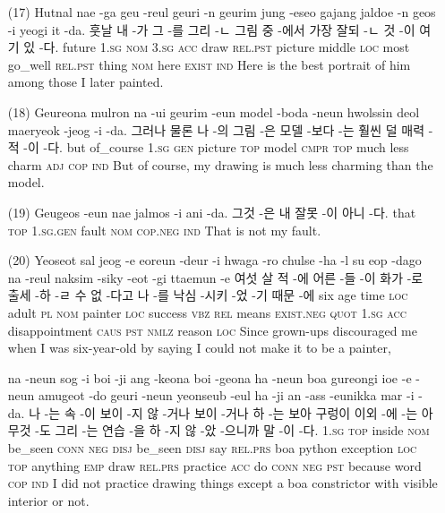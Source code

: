 \begin{itemize}
\item [(17)]
\tgl
		{Hutnal nae -ga geu -reul geuri -n geurim jung -eseo gajang jaldoe -n geos -i yeogi it -da.}
		{훗날 내 -가 그 -를 그리 -ㄴ 그림 중 -에서 가장 잘되 -ㄴ 것 -이 여기 있 -다.}
		{future	\textsc{1.sg}	\textsc{nom}	\textsc{3.sg}	\textsc{acc}	draw	\textsc{rel.pst}	picture	middle	\textsc{loc}	most	go\_well	\textsc{rel.pst}	thing	\textsc{nom}	here	\textsc{exist}	\textsc{ind}}
		{Here is the best portrait of him among those I later painted.}
		
\item [(18)]
\tgl
		{Geureona mulron na -ui geurim -eun model -boda -neun hwolssin deol maeryeok -jeog -i -da.}
		{그러나 물론 나 -의 그림 -은 모델 -보다 -는 훨씬 덜 매력 -적 -이 -다.}
		{but	of\_course	\textsc{1.sg}	\textsc{gen}	picture	\textsc{top}	model	\textsc{cmpr}	\textsc{top}	much	less	charm	\textsc{adj}	\textsc{cop}	\textsc{ind}}
		{But of course, my drawing is much less charming than the model.}
		
\item [(19)]
\tgl
		{Geugeos -eun nae jalmos -i ani -da.}
		{그것 -은 내 잘못 -이 아니 -다.}
		{that	\textsc{top}	\textsc{1.sg.gen}	fault	\textsc{nom}	\textsc{cop.neg}	\textsc{ind}}
		{That is not my fault.}
		
\item [(20)]
\tgl
		{Yeoseot sal jeog -e eoreun -deur -i hwaga -ro chulse -ha -l su eop -dago na -reul naksim -siky -eot -gi ttaemun -e}
		{여섯 살 적 -에 어른 -들 -이 화가 -로 출세 -하 -ㄹ 수 없 -다고 나 -를 낙심 -시키 -었 -기 때문 -에}
		{six	age	time	\textsc{loc}	adult	\textsc{pl}	\textsc{nom}	painter	\textsc{loc}	success	\textsc{vbz}	\textsc{rel}	means	\textsc{exist.neg}	\textsc{quot}	\textsc{1.sg}	\textsc{acc}	disappointment	\textsc{caus}	\textsc{pst}	\textsc{nmlz}	reason	\textsc{loc}}
		{Since grown-ups discouraged me when I was six-year-old by saying I could not make it to be a painter,}
		
\tgl
		{na -neun sog -i boi -ji ang -keona boi -geona ha -neun boa gureongi ioe -e -neun amugeot -do geuri -neun yeonseub -eul ha -ji an -ass -eunikka mar -i -da.}
		{나 -는 속 -이 보이 -지 않 -거나 보이 -거나 하 -는 보아 구렁이 이외 -에 -는 아무것 -도 그리 -는 연습 -을 하 -지 않 -았 -으니까 말 -이 -다.}
		{\textsc{1.sg}	\textsc{top}	inside	\textsc{nom}	be\_seen	\textsc{conn}	\textsc{neg}	\textsc{disj}	be\_seen	\textsc{disj}	say	\textsc{rel.prs}	boa	python	exception	\textsc{loc}	\textsc{top}	anything	\textsc{emp}	draw	\textsc{rel.prs}	practice	\textsc{acc}	do	\textsc{conn}	\textsc{neg}	\textsc{pst}	because	word	\textsc{cop}	\textsc{ind}}
		{I did not practice drawing things except a boa constrictor with visible interior or not.}


\end{itemize}
